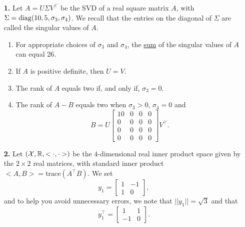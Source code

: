 \documentclass[letterpaper]{article}
\newcommand{\trace}{\mathrm{trace}}
\newcommand{\real}{\mathbb R}  %
\begin{document}
\vspace{0.5in}


\begin{enumerate}
\setlength{\itemsep}{5cm}

\item[{\bf 1.}]  Let $A=U\Sigma V^\top$ be the SVD of a real square matrix $A$, with $\Sigma={\rm diag}(10, 5,\sigma_3, \sigma_4)$. We recall that the entries on the diagonal of $\Sigma$ are called the singular values of $A$.
\begin{enumerate}
\setlength{\itemsep}{.15in}
\renewcommand{\labelenumi}{(\alph{enumi})}
\setlength{\itemsep}{.1in}

\item For appropriate choices of $\sigma_3$ and $\sigma_4$, the \underline{sum} of the singular values of $A$ can equal $26$.

\item If $A$ is positive definite, then $U=V$.

\item The rank of $A$  equals two if, and only if, $\sigma_3 =0$.

\item The rank of $A-B$ equals two when  $\sigma_3 >0$, $ \sigma_4=0$ and $$B= U\left[ \begin{array}{cccc} 10 & 0 &0 &0 \\ 0 & 0 & 0 & 0\\ 0 & 0 & 0 & 0 \\ 0 & 0 & 0 & 0 \end{array} \right] V^\top.$$

\end{enumerate}


\vspace*{-2cm}
\item[{\bf 2.}] Let $({\cal X}, \real, <\cdot, \cdot>)$ be the $4$-dimensional real inner product space given by the $2 \times 2$ real matrices, with standard inner product $<A,B>=\trace(A^\top B)$. We set $$y_1=\left[ \begin{array}{rr} 1 & -1 \\ 1 & 0 \end{array} \right],$$
    and to help you avoid unnecessary errors, we note that $||y_1||=\sqrt{3}$ and that
    $$y_1^\top=\left[ \begin{array}{rr} 1 & 1 \\ -1 & 0 \end{array} \right].$$


\end{enumerate}
\end{document}
